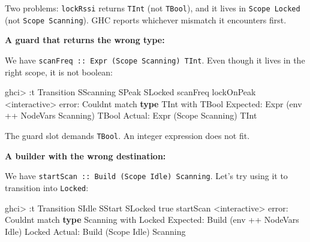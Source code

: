 \documentclass[]{article}
\newenvironment{Shaded}{}{}
\newcommand{\DataTypeTok}[1]{\textcolor[rgb]{0.56,0.13,0.00}{#1}}
\newcommand{\FunctionTok}[1]{\textcolor[rgb]{0.02,0.16,0.49}{#1}}
\newcommand{\KeywordTok}[1]{\textcolor[rgb]{0.00,0.44,0.13}{\textbf{#1}}}
\newcommand{\NormalTok}[1]{#1}
\newcommand{\OperatorTok}[1]{\textcolor[rgb]{0.40,0.40,0.40}{#1}}
\begin{document}
Two problems: \texttt{lockRssi} returns \texttt{TInt} (not \texttt{TBool}), and
it lives in \texttt{Scope\ Locked} (not \texttt{Scope\ Scanning}). GHC reports
whichever mismatch it encounters first.

\textbf{A guard that returns the wrong type:}

We have \texttt{scanFreq\ ::\ Expr\ (Scope\ Scanning)\ TInt}. Even though it
lives in the right scope, it is not boolean:

\begin{Shaded}
\begin{Highlighting}[]
\NormalTok{ghci}\OperatorTok{\textgreater{}} \OperatorTok{:}\NormalTok{t }\DataTypeTok{Transition} \DataTypeTok{SScanning} \DataTypeTok{SPeak} \DataTypeTok{SLocked}\NormalTok{ scanFreq lockOnPeak}
\OperatorTok{\textless{}}\NormalTok{interactive}\OperatorTok{\textgreater{}} \FunctionTok{error}\OperatorTok{:}
    \DataTypeTok{Couldn\textquotesingle{}t}\NormalTok{ match }\KeywordTok{type} \DataTypeTok{\textquotesingle{}TInt\textquotesingle{}}\NormalTok{ with }\DataTypeTok{\textquotesingle{}TBool\textquotesingle{}}
      \DataTypeTok{Expected}\OperatorTok{:} \DataTypeTok{Expr}\NormalTok{ (env }\OperatorTok{++} \DataTypeTok{NodeVars} \DataTypeTok{Scanning}\NormalTok{) }\DataTypeTok{TBool}
        \DataTypeTok{Actual}\OperatorTok{:} \DataTypeTok{Expr}\NormalTok{ (}\DataTypeTok{Scope} \DataTypeTok{Scanning}\NormalTok{) }\DataTypeTok{TInt}
\end{Highlighting}
\end{Shaded}

The guard slot demands \texttt{TBool}. An integer expression does not fit.

\textbf{A builder with the wrong destination:}

We have \texttt{startScan\ ::\ Build\ (Scope\ Idle)\ Scanning}. Let's try using
it to transition into \texttt{Locked}:

\begin{Shaded}
\begin{Highlighting}[]
\NormalTok{ghci}\OperatorTok{\textgreater{}} \OperatorTok{:}\NormalTok{t }\DataTypeTok{Transition} \DataTypeTok{SIdle} \DataTypeTok{SStart} \DataTypeTok{SLocked}\NormalTok{ true startScan}
\OperatorTok{\textless{}}\NormalTok{interactive}\OperatorTok{\textgreater{}} \FunctionTok{error}\OperatorTok{:}
    \DataTypeTok{Couldn\textquotesingle{}t}\NormalTok{ match }\KeywordTok{type} \DataTypeTok{\textquotesingle{}Scanning\textquotesingle{}}\NormalTok{ with }\DataTypeTok{\textquotesingle{}Locked\textquotesingle{}}
      \DataTypeTok{Expected}\OperatorTok{:} \DataTypeTok{Build}\NormalTok{ (env }\OperatorTok{++} \DataTypeTok{NodeVars} \DataTypeTok{Idle}\NormalTok{) }\DataTypeTok{Locked}
        \DataTypeTok{Actual}\OperatorTok{:} \DataTypeTok{Build}\NormalTok{ (}\DataTypeTok{Scope} \DataTypeTok{Idle}\NormalTok{) }\DataTypeTok{Scanning}
\end{Highlighting}
\end{Shaded}
\end{document}
